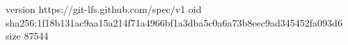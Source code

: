 version https://git-lfs.github.com/spec/v1
oid sha256:1f18b131ac9aa15a214f71a4966bf1a3dba5c0a6a73b8eec9ad345452fa093d6
size 87544
